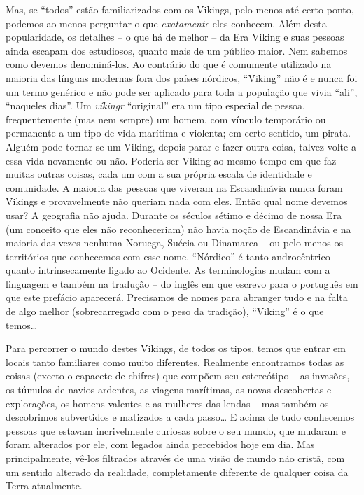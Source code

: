 Mas, se ``todos'' estão familiarizados com os Vikings, pelo menos até
certo ponto, podemos ao menos perguntar o que
\emph{exatamente} eles conhecem. Além desta popularidade, os detalhes --
o que há de melhor -- da Era Viking e suas pessoas ainda escapam dos
estudiosos, quanto mais de um público maior. Nem sabemos como devemos
denominá-los. Ao contrário do que é comumente utilizado na maioria das
línguas modernas fora dos países nórdicos, ``Viking'' não é e nunca foi
um termo genérico e não pode ser aplicado para toda a população que
vivia ``ali'', ``naqueles dias''. Um \emph{víkingr} ``original'' era um
tipo especial de pessoa, frequentemente (mas nem sempre) um homem, com
vínculo temporário ou permanente a um tipo de vida marítima e violenta;
em certo sentido, um pirata. Alguém pode tornar-se um Viking, depois
parar e fazer outra coisa, talvez volte a essa vida novamente ou não.
Poderia ser Viking ao mesmo tempo em que faz muitas outras coisas, cada
um com a sua própria escala de identidade e comunidade. A maioria das
pessoas que viveram na Escandinávia nunca foram Vikings e provavelmente
não queriam nada com eles. Então qual nome devemos usar? A geografia não
ajuda. Durante os séculos sétimo e décimo de nossa Era (um conceito que
eles não reconheceriam) não havia noção de Escandinávia e na maioria das
vezes nenhuma Noruega, Suécia ou Dinamarca -- ou pelo menos os
territórios que conhecemos com esse nome. ``Nórdico'' é tanto
androcêntrico quanto intrinsecamente ligado ao Ocidente. As
terminologias mudam com a linguagem e também na tradução -- do inglês em
que escrevo para o português em que este prefácio aparecerá. Precisamos
de nomes para abranger tudo e na falta de algo melhor (sobrecarregado
com o peso da tradição), ``Viking'' é o que temos\ldots{}

Para percorrer o mundo destes Vikings, de todos os tipos, temos que
entrar em locais tanto familiares como muito diferentes. Realmente
encontramos todas as coisas (exceto o capacete de chifres) que compõem
seu estereótipo -- as invasões, os túmulos de navios ardentes, as
viagens marítimas, as novas descobertas e explorações, os homens
valentes e as mulheres das lendas -- mas também os descobrimos
subvertidos e matizados a cada passo\ldots{} E acima de tudo conhecemos
pessoas que estavam incrivelmente curiosas sobre o seu mundo, que
mudaram e foram alterados por ele, com legados ainda percebidos hoje em
dia. Mas principalmente, vê-los filtrados através de uma visão de mundo
não cristã, com um sentido alterado da realidade, completamente
diferente de qualquer coisa da Terra atualmente.

